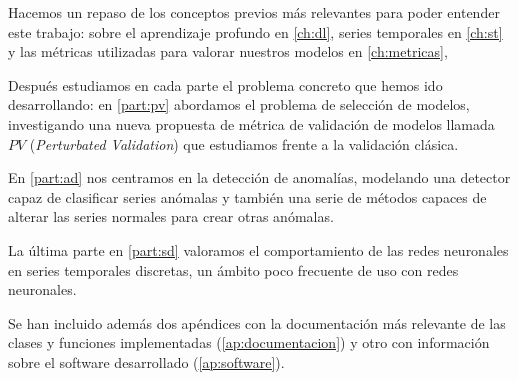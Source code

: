 Hacemos un repaso de los conceptos previos más relevantes para poder entender este trabajo: sobre el aprendizaje profundo en \autoref{ch:dl}, series temporales en \autoref{ch:st} y las métricas utilizadas para valorar nuestros modelos en \autoref{ch:metricas},

Después estudiamos en cada parte el problema concreto que hemos ido desarrollando: en \autoref{part:pv} abordamos el problema de selección de modelos, investigando una nueva propuesta de métrica de validación de modelos llamada $PV$ (\emph{Perturbated Validation}) que estudiamos frente a la validación clásica.

En \autoref{part:ad} nos centramos en la detección de anomalías, modelando una detector capaz de clasificar series anómalas y también una serie de métodos capaces de alterar las series normales para crear otras anómalas.

La última parte en \autoref{part:sd} valoramos el comportamiento de las redes neuronales en series temporales discretas, un ámbito poco frecuente de uso con redes neuronales.

Se han incluido además dos apéndices con la documentación más relevante de las clases y funciones implementadas (\autoref{ap:documentacion}) y otro con información sobre el software desarrollado (\autoref{ap:software}).

\endinput
